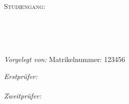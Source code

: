 \documentclass[
11pt, %
oneside, %
ngerman, %
singlespacing, %
headsepline, %
chapterinoneline, %
]{MastersDoctoralThesis} %
\author{Max \textsc{Mustermann}} %
\begin{document}
\frontmatter %

\pagestyle{plain} %

\sloppy

\begin{titlepage}
 \begin{center}

  \vspace*{.04\textheight}
  {\scshape\LARGE \univname\par}\vspace{0.8cm} %
  {\scshape\LARGE \facname\par}\vspace{0.8cm} %
  \textsc{\Large Studiengang:}\\[0.5cm] %
  \textsc{\Large \degreename}\\[0.5cm] %

  \HRule \\[0.4cm] %
  {\huge \bfseries \ttitle\par}\vspace{0.4cm} %
  \HRule \\[1.5cm] %

  \begin{minipage}[t]{0.4\textwidth}
    \begin{flushleft} \large
     \emph{Vorgelegt von:}
     \newline
     \authorname
     \newline
     Matrikelnummer: 123456
     \newline
     \addressname
    \end{flushleft}
   \end{minipage}
   \begin{minipage}[t]{0.4\textwidth}
    \begin{flushright} \large
     \emph{Erstprüfer:} \\
     \href{https://myserver.com}{\supname}\\
     \emph{Zweitprüfer:} \\
     \href{https://myserver.com}{\examname}
    \end{flushright}
   \end{minipage}\\[1cm]


\end{center}
\end{titlepage}
\end{document}
